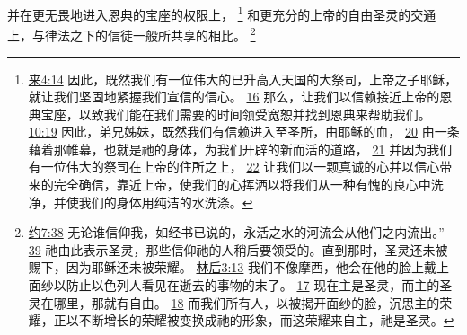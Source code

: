 \documentclass[12pt, a4paper, oneside]{ctexart}
\begin{document}
	并在更无畏地进入恩典的宝座的权限上，
	\footnote {
		\href{https://biblehub.com/hebrews/4-14.htm}{来4:14} 因此，既然我们有一位伟大的已升高入天国的大祭司，上帝之子耶稣，就让我们坚固地紧握我们宣信的信心。
		\href{https://biblehub.com/hebrews/4-16.htm}{16} 那么，让我们以信赖接近上帝的恩典宝座，以致我们能在我们需要的时间领受宽恕并找到恩典来帮助我们。
		\href{https://biblehub.com/hebrews/10-19.htm}{10:19} 因此，弟兄姊妹，既然我们有信赖进入至圣所，由耶稣的血，
		\href{https://biblehub.com/hebrews/10-20.htm}{20} 由一条藉着那帷幕，也就是祂的身体，为我们开辟的新而活的道路，
		\href{https://biblehub.com/hebrews/10-21.htm}{21} 并因为我们有一位伟大的祭司在上帝的住所之上，
		\href{https://biblehub.com/hebrews/10-22.htm}{22} 让我们以一颗真诚的心并以信心带来的完全确信，靠近上帝，使我们的心挥洒以将我们从一种有愧的良心中洗净，并使我们的身体用纯洁的水洗涤。
	}
	和更充分的上帝的自由圣灵的交通上，与律法之下的信徒一般所共享的相比。
	\footnote {
		\href{https://biblehub.com/john/7-38.htm}{约7:38} 无论谁信仰我，如经书已说的，永活之水的河流会从他们之内流出。”
		\href{https://biblehub.com/john/7-39.htm}{39} 祂由此表示圣灵，那些信仰祂的人稍后要领受的。直到那时，圣灵还未被赐下，因为耶稣还未被荣耀。
		\href{https://biblehub.com/2_corinthians/3-13.htm}{林后3:13} 我们不像摩西，他会在他的脸上戴上面纱以防止以色列人看见在逝去的事物的末了。
		\href{https://biblehub.com/2_corinthians/3-17.htm}{17} 现在主是圣灵，而主的圣灵在哪里，那就有自由。
		\href{https://biblehub.com/2_corinthians/3-18.htm}{18} 而我们所有人，以被揭开面纱的脸，沉思主的荣耀，正以不断增长的荣耀被变换成祂的形象，而这荣耀来自主，祂是圣灵。
	}
\end{document}
